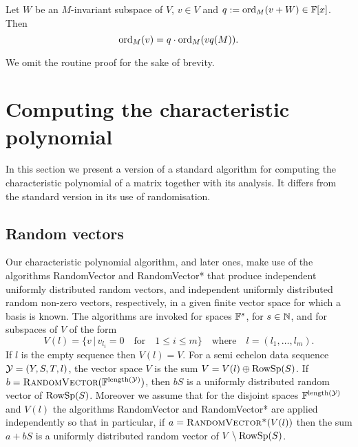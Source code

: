\begin{Lemm}
\label{absordpoly}
Let $W$ be an $M$-invariant subspace of $V$, $v \in V$ and 
$q := \mathrm{ord}_M(v+W) \in \mathbb{F}[x]$. Then
\[ \mathrm{ord}_M(v) = q \cdot \mathrm{ord}_M(vq(M)). \]
\end{Lemm}
\noindent We omit the routine proof for the sake of brevity. \proofend

\section{Computing the characteristic polynomial}

\label{charpoly}

In this section we present a version of a standard algorithm for computing
the characteristic polynomial of a matrix together with its analysis. 
It differs from the standard version in its use of randomisation. 

\subsection{Random vectors}\label{random}
%
%
Our characteristic polynomial algorithm, and later ones, 
make use of the algorithms {\sc Ran\-dom\-Vec\-tor} and 
{\sc RandomVector*} that produce independent uniformly 
dis\-tri\-bu\-ted random vectors, and independent uniformly distributed
random non-zero vectors,             
respectively, in a given finite vector space for which a basis is known.    
The algorithms are invoked for spaces
$\mathbb{F}^s$, for $s \in \mathbb{N}$, and for subspaces of $V$ of the form
\[
V(l)=\{ v\,|\, v_{l_i}=0\quad\mbox{for}\quad  1\leq i\leq m\}
\quad\mbox{where}\quad l=(l_1,\dots,l_m).
\]
If $l$ is the empty sequence then $V(l)=V$.
For a semi echelon data sequence $\mathcal{Y} = (Y,S,T,l)$, the 
vector space $V$ is the sum $V=V(l) \oplus \mathrm{RowSp}(S)$. 
If $b=\mbox{\sc RandomVector}(\mathbb{F}^{\mathrm{length}(\mathcal{Y})})$, then $bS$ is a
uniformly distributed random vector of $\mathrm{RowSp}(S)$. 
Moreover we assume that for the disjoint spaces 
$\mathbb{F}^{\mathrm{length}(\mathcal{Y})}$ and $V(l)$ the 
algorithms {\sc RandomVector} and {\sc RandomVector*} are applied 
independently so that in particular, 
if $a=\mbox{\sc RandomVector*}(V(l))$ 
then the sum 
$a + bS$ is a uniformly distributed random vector of $V\setminus \mathrm{RowSp}(S)$. 

